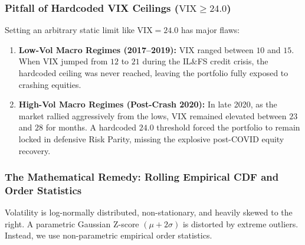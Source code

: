 \documentclass[11pt,a4paper]{article}
\begin{document}
\subsubsection{Pitfall of Hardcoded VIX Ceilings ($\text{VIX} \ge 24.0$)}
Setting an arbitrary static limit like $\text{VIX} = 24.0$ has major flaws:
\begin{enumerate}
    \item \textbf{Low-Vol Macro Regimes (2017--2019):} VIX ranged between $10$ and $15$. When VIX jumped from $12$ to $21$ during the IL\&FS credit crisis, the hardcoded ceiling was never reached, leaving the portfolio fully exposed to crashing equities.
    \item \textbf{High-Vol Macro Regimes (Post-Crash 2020):} In late 2020, as the market rallied aggressively from the lows, VIX remained elevated between $23$ and $28$ for months. A hardcoded $24.0$ threshold forced the portfolio to remain locked in defensive Risk Parity, missing the explosive post-COVID equity recovery.
\end{enumerate}

\subsubsection{The Mathematical Remedy: Rolling Empirical CDF and Order Statistics}
Volatility is log-normally distributed, non-stationary, and heavily skewed to the right. A parametric Gaussian Z-score $(\mu + 2\sigma)$ is distorted by extreme outliers. Instead, we use non-parametric empirical order statistics.
\end{document}
